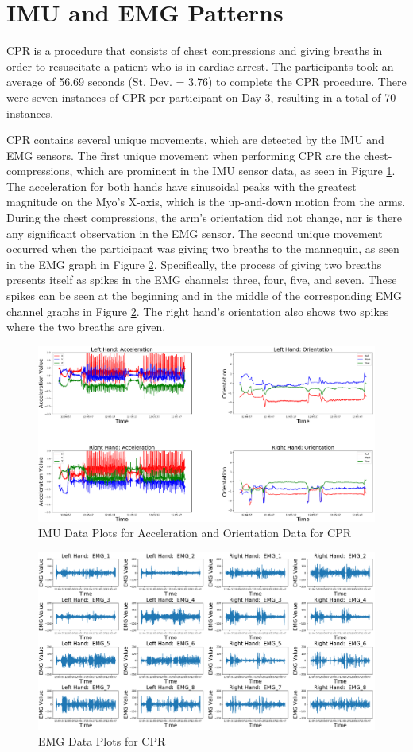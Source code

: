 \section{IMU and EMG Patterns}
\label{sec:Results:Patterns}
CPR is a procedure that consists of chest compressions and giving breaths in order to resuscitate a patient who is in cardiac arrest. The participants took an average of 56.69 seconds (St. Dev. = 3.76) to complete the CPR procedure. There were seven instances of CPR per participant on Day 3, resulting in a total of 70 instances.
\par CPR contains several unique movements, which are detected by the IMU and EMG sensors. The first unique movement when performing CPR are the chest-compressions, which are prominent in the IMU sensor data, as seen in Figure \ref{fig:1571imuday3cpr31}. The acceleration for both hands have sinusoidal peaks with the greatest magnitude on the Myo's X-axis, which is the up-and-down motion from the arms. During the chest compressions, the arm's orientation did not change, nor is there any significant observation in the EMG sensor. The second unique movement occurred when the participant was giving two breaths to the mannequin, as seen in the EMG graph in Figure \ref{fig:1571emgday3cpr31}. Specifically, the process of giving two breaths presents itself as spikes in the EMG channels: three, four, five, and seven. These spikes can be seen at the beginning and in the middle of the corresponding EMG channel graphs in Figure \ref{fig:1571emgday3cpr31}. The right hand's orientation also shows two spikes where the two breaths are given.
\begin{figure}[!h]
	\centering
	\includegraphics[width=0.8\linewidth]{pictures/1571_IMU_Day3_cpr_31}
	\caption{IMU Data Plots for Acceleration and Orientation Data for CPR}
	\label{fig:1571imuday3cpr31}
\end{figure}
\begin{figure}[!h]
	\centering
	\includegraphics[width=0.8\linewidth]{pictures/1571_EMG_Day3_cpr_31}
	\caption{EMG Data Plots for CPR}
	\label{fig:1571emgday3cpr31}
\end{figure}

